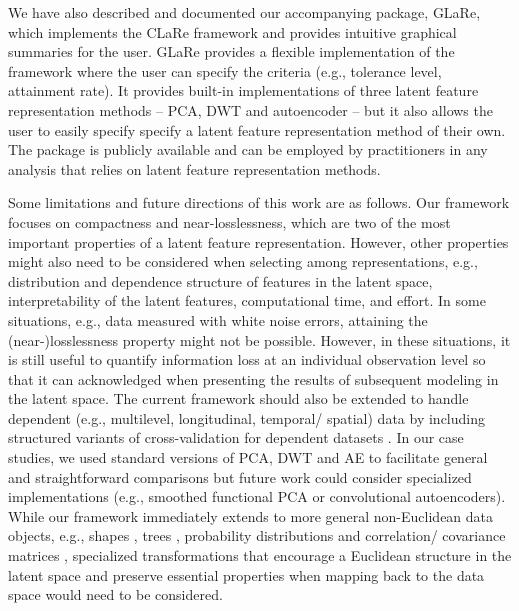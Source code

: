 We have also described and documented our accompanying  package, GLaRe, which implements the CLaRe framework and provides intuitive graphical summaries for the user.
GLaRe provides a flexible implementation of the framework where the user can specify the criteria (e.g., tolerance level, attainment rate).
It provides built-in implementations of three latent feature representation methods -- PCA, DWT and autoencoder -- but it also allows the user to easily specify specify a latent feature representation method of their own. The package is publicly available and can be employed by practitioners in any analysis that relies on latent feature representation methods.


Some limitations and future directions of this work are as follows.
Our framework focuses on compactness and near-losslessness, which are two of the most important properties of a latent feature representation.
However, other properties might also need to be considered when selecting among representations, e.g., distribution and dependence structure of features in the latent space, interpretability of the latent features, computational time, and effort.
In some situations, e.g., data measured with white noise errors, attaining the (near-)losslessness property might not be possible.
However, in these situations, it is still useful to quantify information loss at an individual observation level so that it can acknowledged when presenting the results of subsequent modeling in the latent space.
The current framework should also be extended to handle dependent (e.g., multilevel, longitudinal, temporal/ spatial) data by including structured variants of cross-validation for dependent datasets
\parencite{bergmeir_note_2018, hornung_evaluating_2023, roberts_cross-validation_2017}.
In our case studies, we used standard versions of PCA, DWT and AE to facilitate general and straightforward comparisons but future work could consider specialized implementations (e.g., smoothed functional PCA or convolutional autoencoders).
While our framework immediately extends to more general non-Euclidean data objects, e.g., shapes \parencite{srivastava_shape_2011}, trees \parencite{wang_object_2007}, probability distributions \parencite{petersen_functional_2016, yang_quantile_2020} and correlation/ covariance matrices \parencite{desai_connectivity_2023}, specialized transformations that encourage a Euclidean structure in the latent space and preserve essential properties when mapping back to the data space would need to be considered.